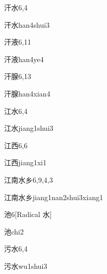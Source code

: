 \begin{entry}{汗水}{6,4}
  \begin{phonetics}{汗水}{han4shui3}
  \end{phonetics}
\end{entry}

\begin{entry}{汗液}{6,11}
  \begin{phonetics}{汗液}{han4ye4}
  \end{phonetics}
\end{entry}

\begin{entry}{汗腺}{6,13}
  \begin{phonetics}{汗腺}{han4xian4}
  \end{phonetics}
\end{entry}

\begin{entry}{江水}{6,4}
  \begin{phonetics}{江水}{jiang1shui3}
  \end{phonetics}
\end{entry}

\begin{entry}{江西}{6,6}
  \begin{phonetics}{江西}{jiang1xi1}
  \end{phonetics}
\end{entry}

\begin{entry}{江南水乡}{6,9,4,3}
  \begin{phonetics}{江南水乡}{jiang1nan2shui3xiang1}
  \end{phonetics}
\end{entry}

\begin{entry}{池}{6}[Radical 水]
  \begin{phonetics}{池}{chi2}
  \end{phonetics}
\end{entry}

\begin{entry}{污水}{6,4}
  \begin{phonetics}{污水}{wu1shui3}
  \end{phonetics}
\end{entry}

